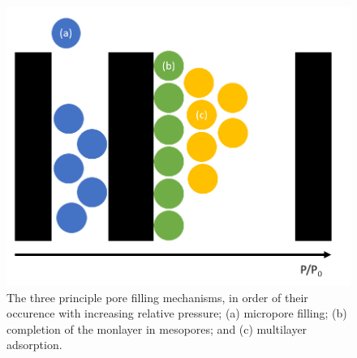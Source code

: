 \begin{figure}[hb!]
    \centering
    \includegraphics[width=\columnwidth, keepaspectratio]{1-introduction/figs/pore_filling.png}
    \caption{The three principle pore filling mechanisms, in order of their occurence with increasing relative pressure; (a) micropore filling; (b) completion of the monlayer in mesopores; and (c) multilayer adsorption.}
    \label{fig:filling}
\end{figure}


